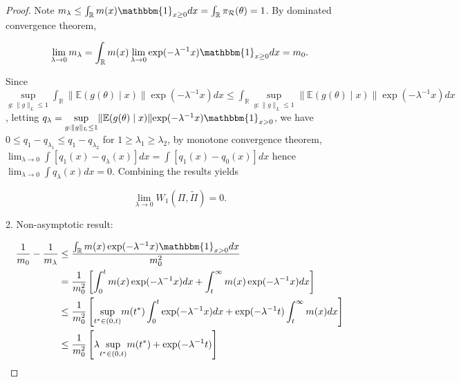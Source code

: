 \documentclass[10pt,fleqn]{article}
\newcommand{\mc}[1]{\mathcal{#1}}
\DeclareMathOperator{\1}{\mathbbm{1}}
\begin{document}
\begin{proof}[Proof]
Note $m_\lambda\le \int_\mathbb{R} m(x) \mathbbm{1}_{x \ge 0}  dx =\int_\mathbb{R} \pi_{\mc R}(\theta) =1$. By dominated convergence theorem, 

\begin{equation}
\lim_{\lambda\rightarrow 0}m_\lambda= \int_\mathbb{R}  m(x) \lim_{\lambda\rightarrow 0}\exp(- \lambda^{-1} x ) \mathbbm{1}_{x \ge 0}  d x = m_0.
\end{equation}


Since 
$ \underset{g:\|g\|_L\le 1}\sup \int_\mathbb{R}  \|\mathbb{E}(g(\theta) \mid x)\| { \exp(- \lambda^{-1} x)} dx \le \int_\mathbb{R} \underset{g:\|g\|_L\le 1}\sup \|\mathbb{E}(g(\theta) \mid x)\| { \exp(- \lambda^{-1} x)} dx$,
letting $q_\lambda=       \underset{g:\|g\|_L\le 1}\sup \|\mathbb{E}(g(\theta) \mid x)\| { \exp(- \lambda^{-1} x)}
\mathbbm{1}_{x > 0}  $, we have $0\le q_1-q_{\lambda_1}\le q_1-q_{\lambda_2}$ for $1\ge\lambda_1\ge \lambda_2$, by monotone convergence theorem, $\lim_{\lambda\rightarrow 0}\int [ q_1(x)-q_\lambda(x)]dx = \int [q_1(x)- q_0(x) ]dx$ hence $\lim_{\lambda\rightarrow 0}\int q_\lambda(x)dx =0$. Combining the results yields 



\begin{equation}
\underset{\lambda \rightarrow 0}\lim W_1(\Pi,\tilde\Pi)=0.        \end{equation}

2. Non-asymptotic result:


\begin{equation}
\label{wass1}
\begin{aligned}
\frac{1}{m_0}-\frac{1}{m_\lambda} & \le  \frac{   \int_\mathbb{R}  m(x) \exp(- \lambda^{-1} x ) \mathbbm{1}_{x > 0}  d x } {  m_0^2}  \\
&= \frac{1}{ m_0^2} \left[ \int_0^{t}  m(x) \exp(- \lambda^{-1} x ) dx + \int_t^{\infty}  m(x) \exp(- \lambda^{-1} x ) dx \right] \\
&\le \frac{1}{ m_0^2} \left[  \underset{t^*\in (0,t)}\sup m(t^{*})\int_0^{t} \exp(- \lambda^{-1} x ) dx + \exp(- \lambda^{-1} t )\int_t^{\infty}  m(x) dx  \right] \\
&\le \frac{1}{ m_0^2} \left[\lambda \underset{t^*\in (0,t)}\sup  m(t^{*})  + \exp(- \lambda^{-1} t ) \right] 
\end{aligned}
\end{equation}


\end{proof}
\end{document}
